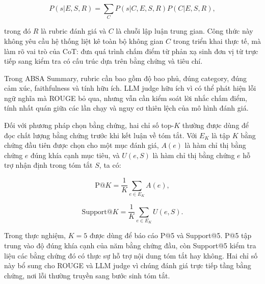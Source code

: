 \begin{equation}
P(s|E,S,R)=\sum_{C}P(s|C,E,S,R)P(C|E,S,R),
\label{eq:dev-chap2-cot-judge}
\end{equation}

trong đó $R$ là rubric đánh giá và $C$ là chuỗi lập luận trung gian. Công thức này không yêu cầu hệ thống liệt kê toàn bộ không gian $C$ trong triển khai thực tế, mà làm rõ vai trò của CoT: đưa quá trình chấm điểm từ phản xạ sinh đơn vị từ trực tiếp sang kiểm tra có cấu trúc dựa trên bằng chứng và tiêu chí.

Trong ABSA Summary, rubric cần bao gồm độ bao phủ, đúng category, đúng cảm xúc, faithfulness và tính hữu ích. LLM judge hữu ích vì có thể phát hiện lỗi ngữ nghĩa mà ROUGE bỏ qua, nhưng vẫn cần kiểm soát lời nhắc chấm điểm, tính nhất quán giữa các lần chạy và nguy cơ thiên lệch của mô hình đánh giá.

Đối với phương pháp chọn bằng chứng, hai chỉ số top-$K$ thường được dùng để đọc chất lượng bằng chứng trước khi kết luận về tóm tắt. Với $E_K$ là tập $K$ bằng chứng đầu tiên được chọn cho một mục đánh giá, $A(e)$ là hàm chỉ thị bằng chứng $e$ đúng khía cạnh mục tiêu, và $U(e,S)$ là hàm chỉ thị bằng chứng $e$ hỗ trợ nhận định trong tóm tắt $S$, ta có:

\begin{equation}
\mathrm{P@}K=\frac{1}{K}\sum_{e\in E_K}A(e),
\label{eq:dev-chap2-p-at-k}
\end{equation}

\begin{equation}
\mathrm{Support@}K=\frac{1}{K}\sum_{e\in E_K}U(e,S).
\label{eq:dev-chap2-support-at-k}
\end{equation}

Trong thực nghiệm, $K=5$ được dùng để báo cáo P@5 và Support@5. P@5 tập trung vào độ đúng khía cạnh của năm bằng chứng đầu, còn Support@5 kiểm tra liệu các bằng chứng đó có thực sự hỗ trợ nội dung tóm tắt hay không. Hai chỉ số này bổ sung cho ROUGE và LLM judge vì chúng đánh giá trực tiếp tầng bằng chứng, nơi lỗi thường truyền sang bước sinh tóm tắt.

